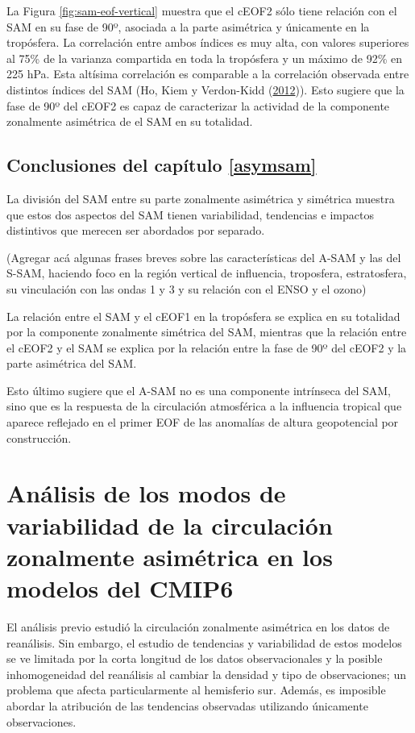 \documentclass[12pt,oneside,a4paper]{reedthesis}
\begin{document}
La Figura \ref{fig:sam-eof-vertical} muestra que el cEOF2 sólo tiene relación con el SAM en su fase de 90º, asociada a la parte asimétrica y únicamente en la tropósfera.
La correlación entre ambos índices es muy alta, con valores superiores al 75\% de la varianza compartida en toda la tropósfera y un máximo de 92\% en 225 hPa.
Esta altísima correlación es comparable a la correlación observada entre distintos índices del SAM (Ho, Kiem y Verdon-Kidd (\protect\hyperlink{ref-ho2012}{2012})).
Esto sugiere que la fase de 90º del cEOF2 es capaz de caracterizar la actividad de la componente zonalmente asimétrica de el SAM en su totalidad.

\hypertarget{conclusiones-del-capuxedtulo-refasymsam}{%
\section{Conclusiones del capítulo \ref{asymsam}}\label{conclusiones-del-capuxedtulo-refasymsam}}

La división del SAM entre su parte zonalmente asimétrica y simétrica muestra que estos dos aspectos del SAM tienen variabilidad, tendencias e impactos distintivos que merecen ser abordados por separado.

(Agregar acá algunas frases breves sobre las características del A-SAM y las del S-SAM, haciendo foco en la región vertical de influencia, troposfera, estratosfera, su vinculación con las ondas 1 y 3 y su relación con el ENSO y el ozono)

La relación entre el SAM y el cEOF1 en la tropósfera se explica en su totalidad por la componente zonalmente simétrica del SAM, mientras que la relación entre el cEOF2 y el SAM se explica por la relación entre la fase de 90º del cEOF2 y la parte asimétrica del SAM.

Esto último sugiere que el A-SAM no es una componente intrínseca del SAM, sino que es la respuesta de la circulación atmosférica a la influencia tropical que aparece reflejado en el primer EOF de las anomalías de altura geopotencial por construcción.

\hypertarget{cmip6}{%
\chapter{Análisis de los modos de variabilidad de la circulación zonalmente asimétrica en los modelos del CMIP6}\label{cmip6}}

El análisis previo estudió la circulación zonalmente asimétrica en los datos de reanálisis.
Sin embargo, el estudio de tendencias y variabilidad de estos modelos se ve limitada por la corta longitud de los datos observacionales y la posible inhomogeneidad del reanálisis al cambiar la densidad y tipo de observaciones; un problema que afecta particularmente al hemisferio sur.
Además, es imposible abordar la atribución de las tendencias observadas utilizando únicamente observaciones.
\end{document}
